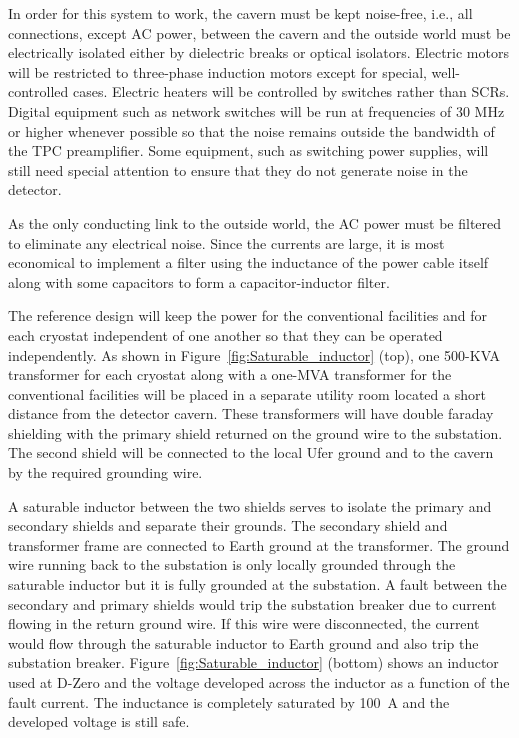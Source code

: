 In order for this system to work, the cavern must be kept noise-free, i.e.,  all  connections, except AC power, between the cavern and the outside world must be electrically isolated either by dielectric breaks or optical isolators.  
Electric motors will be restricted to three-phase induction motors except for special, well-controlled cases.  Electric heaters will be controlled by switches rather than SCRs.  Digital equipment such as network switches will 
be run at frequencies of 30 MHz or higher whenever possible so that the noise remains outside the bandwidth of the TPC preamplifier.  Some equipment, such as switching power supplies, will still need special attention to ensure that they do not generate noise in the detector.  

As the only conducting link to the outside world, the AC power must be filtered to eliminate any electrical noise.  Since the currents are large, it is most economical to implement a filter using the inductance of the power cable itself along with some capacitors to form a capacitor-inductor filter.  


The reference design will keep the power for the conventional facilities and for each cryostat  independent of one another so that they can be operated independently. As shown in Figure~\ref{fig:Saturable_inductor} (top), one 500-KVA transformer for each cryostat along with a one-MVA transformer for the conventional facilities will be placed in a separate utility room located a short distance from the detector cavern. These transformers will have double faraday shielding with the primary shield returned on the ground wire to the substation.  The second shield will be connected to the local Ufer ground and to the cavern by the required grounding wire.  

A saturable inductor between the two shields serves to isolate the primary and secondary shields and separate their grounds.  The secondary shield and transformer frame are connected to Earth ground at the transformer.  The ground wire running back to the substation is only locally grounded through the saturable inductor but it is fully grounded at the substation.  A fault between the secondary and primary shields would trip the substation breaker due to current flowing in the return ground wire.  If this wire were disconnected, the current would flow through the saturable inductor to Earth ground and also trip the substation breaker.  Figure~\ref{fig:Saturable_inductor} (bottom) shows an inductor used at D-Zero and the voltage developed across the inductor as a function of the fault current.  The inductance is completely saturated by 100~A and the developed voltage is still safe.


